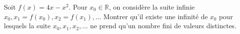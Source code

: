 Soit $f(x) = 4x - x^2$. Pour $x_0 \in \mathbb{R}$, on considère la suite infinie $x_0, x_1 = f(x_0), x_2 = f(x_1), \ldots$ Montrer qu'il existe une infinité de $x_0$ pour lesquels la suite $x_0, x_1, x_2, \ldots$ ne prend qu'un nombre fini de valeurs distinctes.
